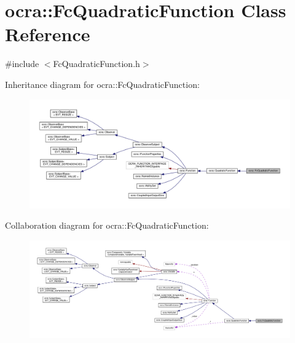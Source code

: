 \hypertarget{classocra_1_1FcQuadraticFunction}{}\section{ocra\+:\+:Fc\+Quadratic\+Function Class Reference}
\label{classocra_1_1FcQuadraticFunction}


{\ttfamily \#include $<$Fc\+Quadratic\+Function.\+h$>$}



Inheritance diagram for ocra\+:\+:Fc\+Quadratic\+Function\+:
\nopagebreak
\begin{figure}[H]
\begin{center}
\leavevmode
\includegraphics[width=350pt]{d0/d8a/classocra_1_1FcQuadraticFunction__inherit__graph}
\end{center}
\end{figure}


Collaboration diagram for ocra\+:\+:Fc\+Quadratic\+Function\+:
\nopagebreak
\begin{figure}[H]
\begin{center}
\leavevmode
\includegraphics[width=350pt]{d3/dbd/classocra_1_1FcQuadraticFunction__coll__graph}
\end{center}
\end{figure}
